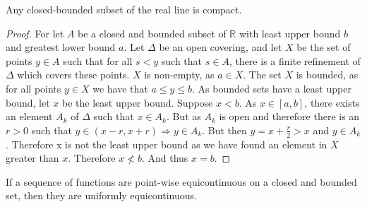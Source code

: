         \begin{theorem}
            Any closed-bounded subset of the real line is compact. 
        \end{theorem}
        \begin{proof}
            For let $A$ be a closed and bounded subset of
            $\mathbb{R}$ with least upper bound $b$ and
            greatest lower bound $a$. Let $\Delta$ be an
            open covering, and let $X$ be the set of
            points $y\in A$ such that for all $s<y$ such
            that $s\in A$, there is a finite refinement
            of $\Delta$ which covers these points. $X$ is
            non-empty, as $a\in X$. The set $X$ is bounded,
            as for all points $y\in X$ we have that
            $a\leq y\leq b$. As bounded sets have a least
            upper bound, let $x$ be the least upper bound.
            Suppose $x<b$. As $x\in [a,b]$, there exists an
            element $A_k$ of $\Delta$ such that $x \in A_k$.
            But as $A_k$ is open and therefore there is an
            $r>0$ such that
            $y\in (x-r,x+r)\Rightarrow y \in A_k$.
            But then $y=x+\frac{r}{2}>x$ and
            $y\in A_k$. Therefore x is not the
            least upper bound as we have found an
            element in $X$ greater than $x$.
            Therefore $x\not<b$. And thus $x=b$.
        \end{proof}
        \begin{theorem}
            If a sequence of functions are
            point-wise equicontinuous on a closed
            and bounded set, then they are
            uniformly equicontinuous.
        \end{theorem}
